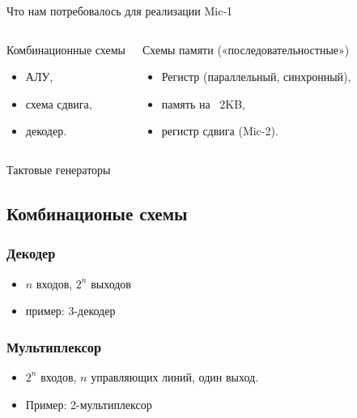 \begin{frame}{Что нам потребовалось для реализации Mic-1}

\begin{columns}
  \column{6cm}
  \begin{block}{Комбинационные схемы}
  \begin{itemize}
    \item АЛУ,
    \item схема сдвига,
    \item декодер.
  \end{itemize}
  \end{block}

  \column{6cm}\pause
  \begin{block}{Схемы памяти («последовательностные»)}
  \begin{itemize}
    \item Регистр (параллельный, синхронный),
    \item память на ~2KB,
    \item регистр сдвига (Mic-2).
  \end{itemize}
  \end{block}
\end{columns}

\pause
\begin{block}{Тактовые генераторы}
\end{block}
\end{frame}

\subsection{Комбинационые схемы}

\begin{frame}
\frametitle{Декодер}
\begin{itemize}
    \item $n$ входов, $2^n$ выходов
    \item пример: 3-декодер\\
    \vspace{-.1cm} \pause {}
\end{itemize}
\end{frame}

\begin{frame}
\frametitle{Мультиплексор}
\begin{itemize}
    \item $2^n$ входов, $n$ управляющих линий, один выход.\pause

    \item Пример: 2-мультиплексор\\
\end{itemize}
\end{frame}

